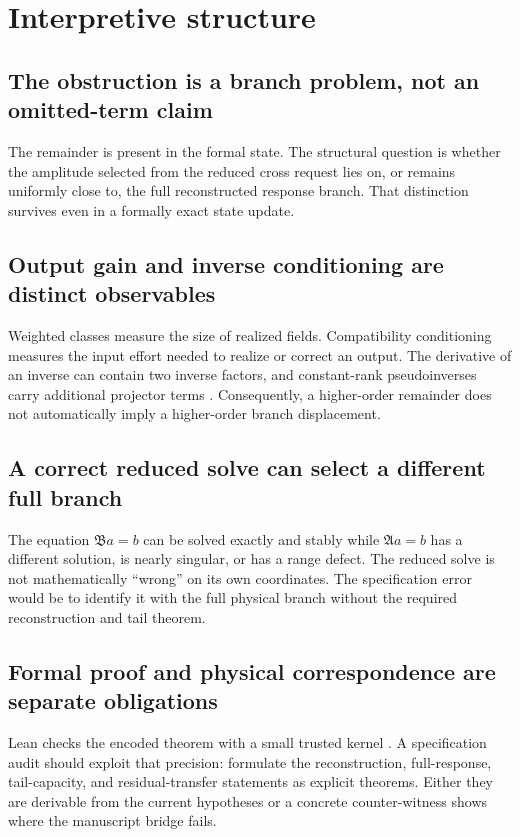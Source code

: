 \documentclass[12pt]{article}
\theoremstyle{plain}
\theoremstyle{definition}
\theoremstyle{remark}
\newcommand{\Comp}{\mathfrak A}
\newcommand{\Red}{\mathfrak B}
\begin{document}
\section{Interpretive structure}\label{sec:interpretation}
\subsection{The obstruction is a branch problem, not an omitted-term claim}
The remainder is present in the formal state. The structural question is whether the amplitude selected from the reduced cross request lies on, or remains uniformly close to, the full reconstructed response branch. That distinction survives even in a formally exact state update.

\subsection{Output gain and inverse conditioning are distinct observables}
Weighted classes measure the size of realized fields. Compatibility conditioning measures the input effort needed to realize or correct an output. The derivative of an inverse can contain two inverse factors, and constant-rank pseudoinverses carry additional projector terms \cite{GolubPereyra1973}. Consequently, a higher-order remainder does not automatically imply a higher-order branch displacement.

\subsection{A correct reduced solve can select a different full branch}
The equation \(\Red a=b\) can be solved exactly and stably while \(\Comp a=b\) has a different solution, is nearly singular, or has a range defect. The reduced solve is not mathematically ``wrong'' on its own coordinates. The specification error would be to identify it with the full physical branch without the required reconstruction and tail theorem.

\subsection{Formal proof and physical correspondence are separate obligations}
Lean checks the encoded theorem with a small trusted kernel \cite{deMouraEtAl2015,Lean4Reference}. A specification audit should exploit that precision: formulate the reconstruction, full-response, tail-capacity, and residual-transfer statements as explicit theorems. Either they are derivable from the current hypotheses or a concrete counter-witness shows where the manuscript bridge fails.
\end{document}
